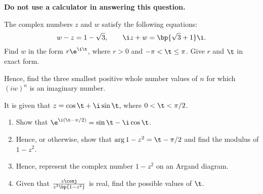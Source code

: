 \begin{problem}
    \textbf{Do not use a calculator in answering this question.}

    The complex numbers $z$ and $w$ satisfy the following equations: \[w - z = 1 - \sqrt3, \qquad \i z + w = \bp{\sqrt3 + 1} \i.\] Find $w$ in the form $r\e^{\i \t}$, where $r > 0$ and $-\pi < \t \leq \pi$. Give $r$ and $\t$ in exact form.

    Hence, find the three smallest positive whole number values of $n$ for which $(iw)^n$ is an imaginary number.
\end{problem}

\begin{problem}[\chili]
    It is given that $z = \cos \t + \i \sin \t$, where $0 < \t < \pi/2$.

    \begin{enumerate}
        \item Show that $\e^{\i (\t - \pi/2)} = \sin\t - \i \cos \t$.
        \item Hence, or otherwise, show that $\arg{1 - z^2} = \t - \pi/2$ and find the modulus of $1 - z^2$.
        \item Hence, represent the complex number $1 - z^2$ on an Argand diagram.
        \item Given that $\frac{z\conj}{z^3 \bp{1 - z^2}}$ is real, find the possible values of $\t$.
    \end{enumerate}
\end{problem}